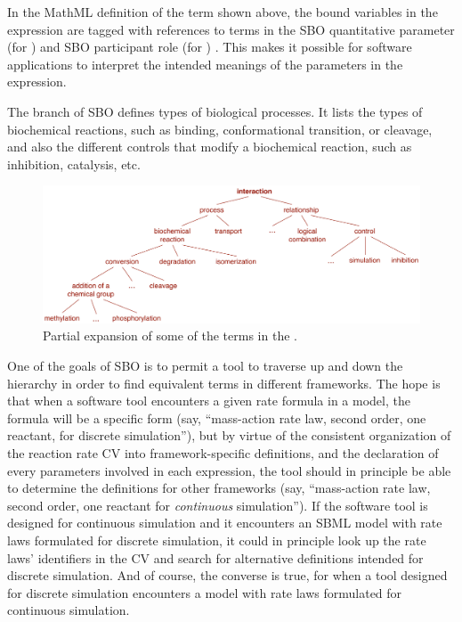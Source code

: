 In the MathML definition of the term shown above, the bound
variables in the  expression are tagged with
references to terms in the SBO quantitative parameter (for
) and SBO participant role (for ) .
This makes it possible for software applications to interpret the
intended meanings of the parameters in the expression.   

The  branch of SBO defines types of biological processes.  It lists the types of biochemical reactions, such as binding,
conformational transition, or cleavage, and also the different
controls that modify a biochemical reaction, such as inhibition,
catalysis, etc.

\begin{figure}[tbh]
  \centering
  \includegraphics[scale = 0.8]{figs/sbo-interaction}
  \caption{Partial expansion of some of the terms in the .}
  \label{fig:sbo-interaction}
\end{figure}

One of the goals of SBO is to permit a tool to traverse up and
down the hierarchy in order to find equivalent terms in different
frameworks.  The hope is that when a software tool encounters a
given rate formula in a model, the formula will be a specific form
(say, ``mass-action rate law, second order, one reactant, for
discrete simulation''), but by virtue of the consistent
organization of the reaction rate CV into framework-specific
definitions, and the declaration of every parameters involved in each expression, the tool should in principle be able to determine the
definitions for other frameworks (say, ``mass-action rate law,
second order, one reactant for \emph{continuous} simulation'').
If the software tool is designed for continuous simulation and it
encounters an SBML model with rate laws formulated for discrete
simulation, it could in principle look up the rate laws'
identifiers in the CV and search for alternative definitions
intended for discrete simulation.  And of course, the converse is
true, for when a tool designed for discrete simulation encounters
a model with rate laws formulated for continuous simulation.


